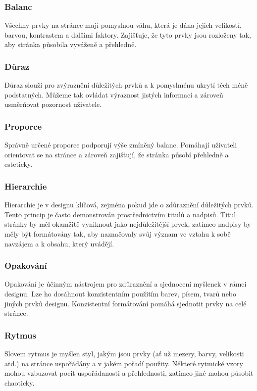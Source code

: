 \subsubsection*{Balanc}
Všechny prvky na stránce mají pomyslnou váhu, která je dána jejich velikostí, barvou, kontrastem a dalšími faktory. Zajišťuje, že tyto prvky jsou rozloženy tak, aby stránka působila vyváženě a přehledně.

\subsubsection*{Důraz}
Důraz slouží pro zvýraznění důležitých prvků a k pomyslménu ukrytí těch méně podstatných. Můžeme tak ovládat výraznost jistých informací a zároveň usměrňovat pozornost uživatele.

\subsubsection*{Proporce}
Správně určené proporce podporují výše zmíněný balanc. Pomáhají uživateli orientovat se na stránce a zároveň zajišťují, že stránka působí přehledně a esteticky.

\subsubsection*{Hierarchie}
Hierarchie je v designu klíčová, zejména pokud jde o zdůraznění důležitých prvků. Tento princip je často demonstrován prostřednictvím titulů a nadpisů. Titul stránky by měl okamžitě vyniknout jako nejdůležitější prvek, zatímco nadpisy by měly být formátovány tak, aby naznačovaly svůj význam ve vztahu k sobě navzájem a k obsahu, který uvádějí.

\subsubsection*{Opakování}
Opakování je účinným nástrojem pro zdůraznění a sjednocení myšlenek v rámci designu. Lze ho dosáhnout konzistentním použitím barev, písem, tvarů nebo jiných prvků designu. Konzistentní formátování pomáhá sjednotit prvky na celé stránce.

\subsubsection*{Rytmus}
Slovem rytmus je myšlen styl, jakým jsou prvky (ať už mezery, barvy, velikosti atd.) na stránce uspořádány a v jakém pořadí použity. Některé rytmické vzory mohou vzbuzovat pocit uspořádanosti a přehlednosti, zatímco jiné mohou působit chaoticky.

